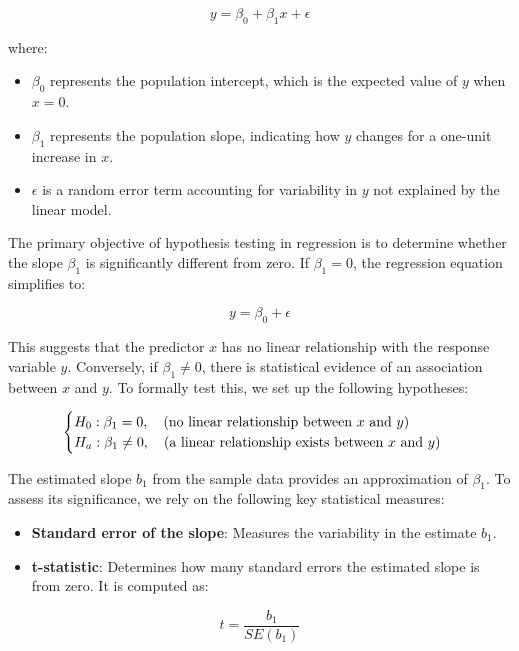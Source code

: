 \documentclass[
]{book}
\providecommand{\tightlist}{%
  \setlength{\itemsep}{0pt}\setlength{\parskip}{0pt}}
\theoremstyle{definition}
\theoremstyle{definition}
\theoremstyle{definition}
\theoremstyle{definition}
\theoremstyle{remark}
\begin{document}
\[
y = \beta_0 + \beta_1x + \epsilon
\]

where:

\begin{itemize}
\tightlist
\item
  \(\beta_0\) represents the population intercept, which is the expected value of \(y\) when \(x = 0\).\\
\item
  \(\beta_1\) represents the population slope, indicating how \(y\) changes for a one-unit increase in \(x\).\\
\item
  \(\epsilon\) is a random error term accounting for variability in \(y\) not explained by the linear model.
\end{itemize}

The primary objective of hypothesis testing in regression is to determine whether the slope \(\beta_1\) is significantly different from zero. If \(\beta_1 = 0\), the regression equation simplifies to:

\[
y = \beta_0 + \epsilon
\]

This suggests that the predictor \(x\) has no linear relationship with the response variable \(y\). Conversely, if \(\beta_1 \neq 0\), there is statistical evidence of an association between \(x\) and \(y\). To formally test this, we set up the following hypotheses:

\[
\begin{cases}
  H_0: \beta_1 =  0, \quad \text{(no linear relationship between \( x \) and \( y \))}  \\
  H_a: \beta_1 \neq 0, \quad \text{(a linear relationship exists between \( x \) and \( y \))}
\end{cases}
\]

The estimated slope \(b_1\) from the sample data provides an approximation of \(\beta_1\). To assess its significance, we rely on the following key statistical measures:

\begin{itemize}
\tightlist
\item
  \textbf{Standard error of the slope}: Measures the variability in the estimate \(b_1\).\\
\item
  \textbf{t-statistic}: Determines how many standard errors the estimated slope is from zero. It is computed as:
\end{itemize}

\[
t = \frac{b_1}{SE(b_1)}
\]
\end{document}

